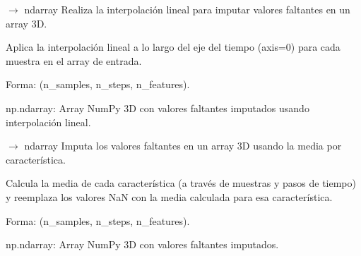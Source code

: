 \documentclass[letterpaper,10pt,english]{sphinxmanual}
\begin{document}
\begin{fulllineitems}
\label{\detokenize{pampaneira_imputation:pampaneira_imputation.imputation_methods.impute_linear}}
\pysigstartsignatures
\pysiglinewithargsret
{}
{}
{{ $\rightarrow$ ndarray}}
\pysigstopsignatures
\sphinxAtStartPar
Realiza la interpolación lineal para imputar valores faltantes en un array 3D.

\sphinxAtStartPar
Aplica la interpolación lineal a lo largo del eje del tiempo (axis=0) para cada muestra
en el array de entrada.
\begin{description}
\begin{description}
\sphinxAtStartPar
Forma: (n\_samples, n\_steps, n\_features).

\end{description}

\sphinxAtStartPar
np.ndarray: Array NumPy 3D con valores faltantes imputados usando interpolación lineal.

\end{description}

\end{fulllineitems}


\begin{fulllineitems}
\label{\detokenize{pampaneira_imputation:pampaneira_imputation.imputation_methods.impute_mean}}
\pysigstartsignatures
\pysiglinewithargsret
{}
{}
{{ $\rightarrow$ ndarray}}
\pysigstopsignatures
\sphinxAtStartPar
Imputa los valores faltantes en un array 3D usando la media por característica.

\sphinxAtStartPar
Calcula la media de cada característica (a través de muestras y pasos de tiempo) y
reemplaza los valores NaN con la media calculada para esa característica.
\begin{description}
\begin{description}
\sphinxAtStartPar
Forma: (n\_samples, n\_steps, n\_features).

\end{description}

\sphinxAtStartPar
np.ndarray: Array NumPy 3D con valores faltantes imputados.

\end{description}

\end{fulllineitems}
\end{document}
